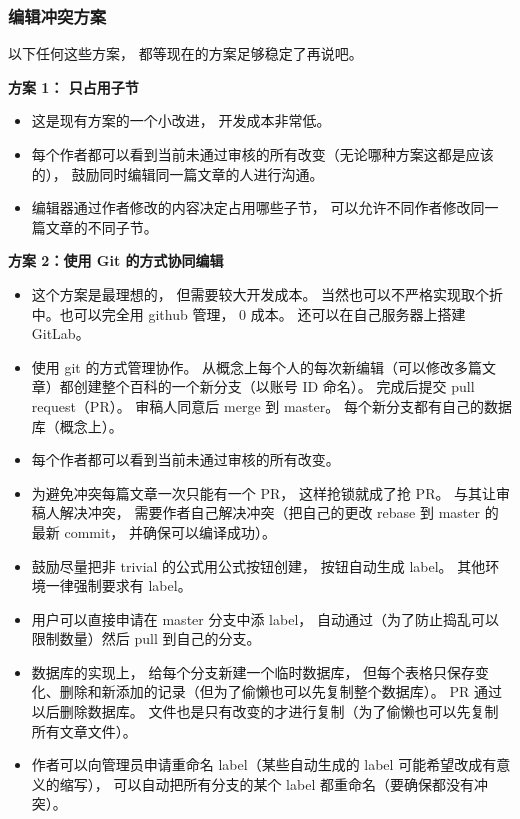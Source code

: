 \subsubsection{编辑冲突方案}
以下任何这些方案， 都等现在的方案足够稳定了再说吧。

\textbf{方案 1： 只占用子节}
\begin{itemize}
\item 这是现有方案的一个小改进， 开发成本非常低。
\item 每个作者都可以看到当前未通过审核的所有改变（无论哪种方案这都是应该的）， 鼓励同时编辑同一篇文章的人进行沟通。
\item 编辑器通过作者修改的内容决定占用哪些子节， 可以允许不同作者修改同一篇文章的不同子节。
\end{itemize}

\textbf{方案 2：使用 Git 的方式协同编辑}
\begin{itemize}
\item 这个方案是最理想的， 但需要较大开发成本。 当然也可以不严格实现取个折中。也可以完全用 github 管理， 0 成本。 还可以在自己服务器上搭建 GitLab。
\item 使用 git 的方式管理协作。 从概念上每个人的每次新编辑（可以修改多篇文章）都创建整个百科的一个新分支（以账号 ID 命名）。 完成后提交 pull request（PR）。 审稿人同意后 merge 到 master。 每个新分支都有自己的数据库（概念上）。
\item 每个作者都可以看到当前未通过审核的所有改变。
\item 为避免冲突每篇文章一次只能有一个 PR， 这样抢锁就成了抢 PR。 与其让审稿人解决冲突， 需要作者自己解决冲突（把自己的更改 rebase 到 master 的最新 commit， 并确保可以编译成功）。
\item 鼓励尽量把非 trivial 的公式用公式按钮创建， 按钮自动生成 label。 其他环境一律强制要求有 label。
\item 用户可以直接申请在 master 分支中添 label， 自动通过（为了防止捣乱可以限制数量）然后 pull 到自己的分支。
\item 数据库的实现上， 给每个分支新建一个临时数据库， 但每个表格只保存变化、删除和新添加的记录（但为了偷懒也可以先复制整个数据库）。 PR 通过以后删除数据库。 文件也是只有改变的才进行复制（为了偷懒也可以先复制所有文章文件）。
\item 作者可以向管理员申请重命名 label（某些自动生成的 label 可能希望改成有意义的缩写）， 可以自动把所有分支的某个 label 都重命名（要确保都没有冲突）。
\end{itemize}

